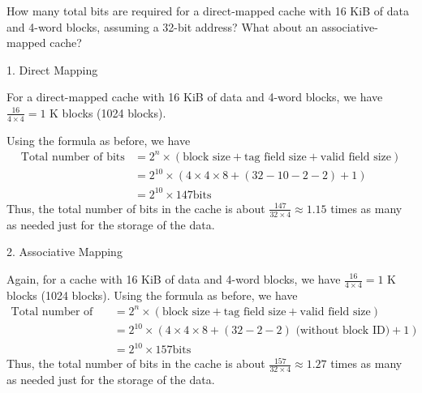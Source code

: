 \begin{eg}
How many total bits are required for a direct-mapped cache with 16 KiB of data and 4-word blocks, assuming a 32-bit address? What about an associative-mapped cache?

1. Direct Mapping 

For a direct-mapped cache with 16 KiB of data and 4-word blocks, we have \( \frac{16}{4 \times 4} = 1 \) K blocks (1024 blocks).

Using the formula as before, we have 
\[
\begin{aligned}
  \text{Total number of bits} &= 2^n \times (\text{block size} + \text{tag field size} + \text{valid field size}) \\
  &= 2^{10} \times (4 \times 4 \times 8 + (32 - 10 - 2 - 2) + 1) \\
  &= 2^{10} \times 147 \text{bits} 
\end{aligned}
\]
Thus, the total number of bits in the cache is about \(\frac{147}{32 \times 4} \approx 1.15\) times as many as needed just for the storage of the data.

2. Associative Mapping

Again, for a cache with 16 KiB of data and 4-word blocks, we have \( \frac{16}{4 \times 4} = 1 \) K blocks (1024 blocks).
Using the formula as before, we have 
\[
\begin{aligned}
  \text{Total number of bits} &= 2^n \times (\text{block size} + \text{tag field size} + \text{valid field size}) \\
  &= 2^{10} \times (4 \times 4 \times 8 + (32 - 2 - 2) \text{ (without block ID)} + 1)\\
  &= 2^{10} \times 157 \text{bits} 
\end{aligned}
\] 
Thus, the total number of bits in the cache is about \(\frac{157}{32 \times 4} \approx 1.27\) times as many as needed just for the storage of the data.
\end{eg}

